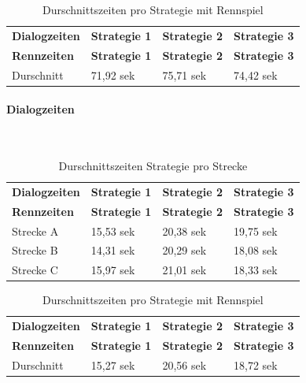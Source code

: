 \documentclass[12pt,a4paper]{scrartcl}
\begin{document}
\begin{longtable}{p{3cm}p{3cm}p{3cm}p{3cm} }
	\label{Dialogzeiten}\\
	\caption[Durschnittszeiten pro Strategie mit Rennspiel]{Durschnittszeiten pro Strategie mit Rennspiel}\\
	\hline
	\textbf{Dialogzeiten}&\textbf{Strategie 1}&\textbf{Strategie 2} &\textbf{Strategie 3}\\
	\hline
	\endfirsthead
	\hline
	\textbf{Rennzeiten}&\textbf{Strategie 1}&\textbf{Strategie 2} &\textbf{Strategie 3}\\
	\hline
	\endhead
Durschnitt & 71,92 sek &75,71 sek & 74,42 sek \\


\hline
\end{longtable}



\paragraph{Dialogzeiten}
~\\

\begin{longtable}{p{3cm}p{3cm}p{3cm}p{3cm} }
	\label{durchschnittsvorl}\\
	\caption[Durschnittszeiten Strategie pro Strecke]{Durschnittszeiten Strategie pro Strecke}\\
	\hline
	\textbf{Dialogzeiten}&\textbf{Strategie 1}&\textbf{Strategie 2} &\textbf{Strategie 3}\\
	\hline
	\endfirsthead
	\hline
	\textbf{Rennzeiten}&\textbf{Strategie 1}&\textbf{Strategie 2} &\textbf{Strategie 3}\\
	\hline
	\endhead
Strecke A & 15,53 sek & 20,38 sek & 19,75 sek \\
Strecke B & 14,31 sek & 20,29 sek & 18,08 sek \\
Strecke C  & 15,97 sek & 21,01 sek & 18,33 sek \\

\hline
\end{longtable}

\begin{longtable}{p{3cm}p{3cm}p{3cm}p{3cm} }
	\label{Dialogzeiten}\\
	\caption[Durschnittszeiten pro Strategie mit Rennspiel]{Durschnittszeiten pro Strategie mit Rennspiel}\\
	\hline
	\textbf{Dialogzeiten}&\textbf{Strategie 1}&\textbf{Strategie 2} &\textbf{Strategie 3}\\
	\hline
	\endfirsthead
	\hline
	\textbf{Rennzeiten}&\textbf{Strategie 1}&\textbf{Strategie 2} &\textbf{Strategie 3}\\
	\hline
	\endhead
Durschnitt & 15,27 sek & 20,56 sek & 18,72 sek \\


\hline
\end{longtable}
\end{document}

